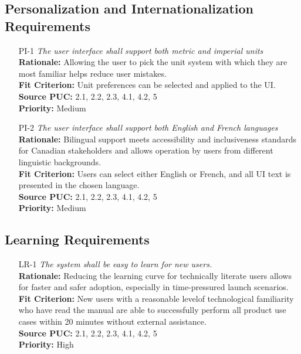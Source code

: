 \documentclass[12pt]{article}
\begin{document}
\subsection{Personalization and Internationalization Requirements}
\begin{itemize}[leftmargin=*]
  \item[PI-1] \emph{The user interface shall support both metric and imperial units}\\[2mm]
        \textbf{Rationale:} Allowing the user to pick the unit system with which they are most familiar helps reduce user mistakes. \\
        \textbf{Fit Criterion:} Unit preferences can be selected and applied to the UI.\\
        \textbf{Source PUC:} 2.1, 2.2, 2.3, 4.1, 4.2, 5 \\
        \textbf{Priority:} Medium
  \item[PI-2] \emph{The user interface shall support both English and French
          languages}\\[2mm]
        \textbf{Rationale:} Bilingual support meets accessibility and inclusiveness standards for Canadian stakeholders and allows operation by users from different linguistic backgrounds.\\
        \textbf{Fit Criterion:} Users can select either English or French, and all UI text is presented in the chosen language.\\
        \textbf{Source PUC:} 2.1, 2.2, 2.3, 4.1, 4.2, 5 \\
        \textbf{Priority:} Medium
\end{itemize}

\subsection{Learning Requirements}
\begin{itemize}[leftmargin=*]
  \item[LR-1] \emph{The system shall be easy to learn for new users.}\\[2mm]
        \textbf{Rationale:} Reducing the learning curve for technically literate users allows for faster and safer adoption, especially in time-pressured launch scenarios.\\
        \textbf{Fit Criterion:} New users with a reasonable levelof technological familiarity who have read the manual are able to successfully perform all product use cases within 20 minutes without external assistance.\\
        \textbf{Source PUC:} 2.1, 2.2, 2.3, 4.1, 4.2, 5 \\
        \textbf{Priority:} High

\end{itemize}
\end{document}
